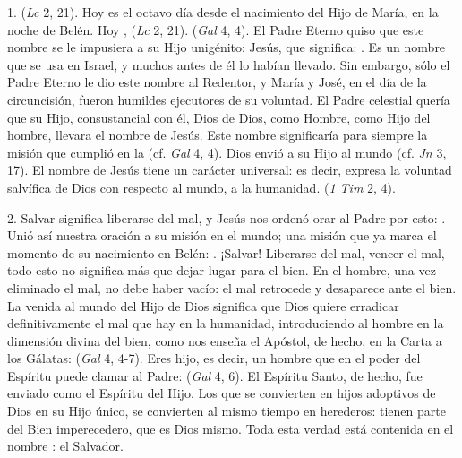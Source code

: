 \begin{body}
	1.  (\emph{Lc} 2, 21). Hoy es el octavo día desde el nacimiento del Hijo de María, en la noche de Belén. Hoy ,  (\emph{Lc} 2, 21).  (\emph{Gal} 4, 4). El Padre Eterno quiso que este nombre se le impusiera a su Hijo unigénito: Jesús, que significa: . Es un nombre que se usa en Israel, y muchos antes de él lo habían llevado. Sin embargo, sólo el Padre Eterno le dio este nombre al Redentor, y María y José, en el día de la circuncisión, fueron humildes ejecutores de su voluntad. El Padre celestial quería que su Hijo, consustancial con él, Dios de Dios, como Hombre, como Hijo del hombre, llevara el nombre de Jesús. Este nombre significaría para siempre la misión que cumplió en la  (cf. \emph{Gal} 4, 4). Dios envió a su Hijo al mundo  (cf. \emph{Jn} 3, 17). El nombre de Jesús tiene un carácter universal: es decir, expresa la voluntad salvífica de Dios con respecto al mundo, a la humanidad.  (\emph{1 Tim} 2, 4).
	
	2. Salvar significa liberarse del mal, y Jesús nos ordenó orar al Padre por esto: . Unió así nuestra oración a su misión en el mundo; una misión que ya marca el momento de su nacimiento en Belén: . ¡Salvar! Liberarse del mal, vencer el mal, todo esto no significa más que dejar lugar para el bien. En el hombre, una vez eliminado el mal, no debe haber vacío: el mal retrocede y desaparece ante el bien. La venida al mundo del Hijo de Dios significa que Dios quiere erradicar definitivamente el mal que hay en la humanidad, introduciendo al hombre en la dimensión divina del bien, como nos enseña el Apóstol, de hecho, en la Carta a los Gálatas:  (\emph{Gal} 4, 4-7). Eres hijo, es decir, un hombre que en el poder del Espíritu puede clamar al Padre:  (\emph{Gal} 4, 6). El Espíritu Santo, de hecho, fue enviado como el Espíritu del Hijo. Los que se convierten en hijos adoptivos de Dios en su Hijo único, se convierten al mismo tiempo en herederos: tienen parte del Bien imperecedero, que es Dios mismo. Toda esta verdad está contenida en el nombre : el Salvador.
	

\end{body}
